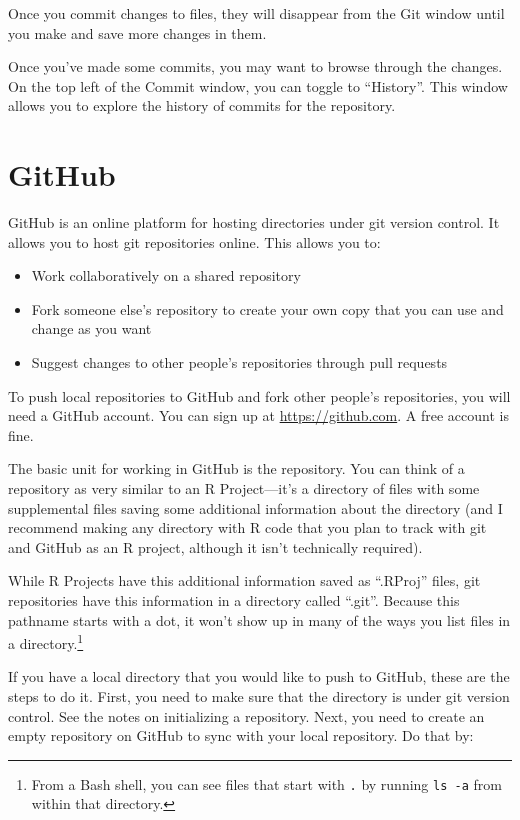 \documentclass[]{tufte-book}
\providecommand{\tightlist}{%
  \setlength{\itemsep}{0pt}\setlength{\parskip}{0pt}}
\begin{document}
Once you commit changes to files, they will disappear from the Git window until
you make and save more changes in them.

Once you've made some commits, you may want to browse through the changes. On
the top left of the Commit window, you can toggle to ``History''. This window
allows you to explore the history of commits for the repository.

\hypertarget{github}{%
\section{GitHub}\label{github}}

GitHub is an online platform for hosting directories under git version control.
It allows you to host git repositories online. This allows you to:

\begin{itemize}
\tightlist
\item
  Work collaboratively on a shared repository
\item
  Fork someone else's repository to create your own copy that you can use and change as you want
\item
  Suggest changes to other people's repositories through pull requests
\end{itemize}

To push local repositories to GitHub and fork other people's repositories, you
will need a GitHub account. You can sign up at \url{https://github.com}. A free
account is fine.

The basic unit for working in GitHub is the repository. You can think of a
repository as very similar to an R Project---it's a directory of files with
some supplemental files saving some additional information about the directory
(and I recommend making any directory with R code that you plan to track with
git and GitHub as an R project, although it isn't technically required).

While R Projects have this additional information saved as ``.RProj'' files, git
repositories have this information in a directory called ``.git''. Because this
pathname starts with a dot, it won't show up in many of the ways you list files
in a directory.\footnote{From a Bash shell, you can see files that start with \texttt{.} by running
  \texttt{ls\ -a} from within that directory.}

If you have a local directory that you would like to push to GitHub, these are
the steps to do it. First, you need to make sure that the directory is under git
version control. See the notes on initializing a repository. Next, you need to
create an empty repository on GitHub to sync with your local repository. Do that
by:
\end{document}

